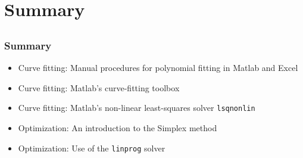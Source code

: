 \documentclass[11pt,table,final,fleqn,xcolor={usenames,dvipsnames,table}]{beamer}
\begin{document}
\section{Summary}
\subsection*{}
\begin{frame}
  \frametitle{Summary}
  \begin{itemize}
    \item Curve fitting: Manual procedures for polynomial fitting in Matlab and Excel
    \item Curve fitting: Matlab's curve-fitting toolbox
    \item Curve fitting: Matlab's non-linear least-squares solver \lstinline$lsqnonlin$
    \item Optimization: An introduction to the Simplex method
    \item Optimization: Use of the \lstinline$linprog$ solver
  \end{itemize}

\end{frame}
\end{document}
